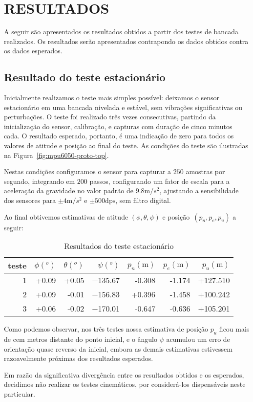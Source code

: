 \chapter{RESULTADOS}\label{chap:resuldatos}

A seguir são apresentados os resultados obtidos a partir dos testes de bancada realizados. Os resultados serão apresentados contrapondo os dados obtidos contra os dados esperados.

\section{Resultado do teste estacionário}

Inicialmente realizamos o teste mais simples possível: deixamos o sensor estacionário em uma bancada nivelada e estável, sem vibrações significativas ou perturbações. O teste foi realizado três vezes consecutivas, partindo da inicialização do sensor, calibração, e capturas com duração de cinco minutos cada. O resultado esperado, portanto, é uma indicação de zero para todos os valores de atitude e posição ao final do teste. As condições do teste são ilustradas na Figura~\ref{fig:mpu6050-proto-top}.

Nestas condições configuramos o sensor para capturar a \(250\) amostras por segundo, integrando em \(200\) passos, configurando um fator de escala para a aceleração da gravidade no valor padrão de \(9.8\textrm{m}/{s}^{2}\), ajustando a sensibilidade dos sensores para \(\pm 4\textrm{m}/{s}^{2}\) e \(\pm 500\textrm{dps}\), sem filtro digital.

Ao final obtivemos estimativas de atitude \((\phi,\theta,\psi)\) e posição~\((p_{n},p_{e},p_{u})\) a seguir:

\begin{table}[ht]
    \caption{Resultados do teste estacionário}
    \centering
    \begin{tabular}{r r r r r r r}
        teste & \(\phi (^{o})\) & \(\theta(^{o})\) & \(\psi(^{o})\) & \(p_{n}(\textrm{m})\) & \(p_{e}(\textrm{m})\) & \(p_{u}(\textrm{m})\)  \\
        \toprule
        1 & +0.09 & +0.05 & +135.67 & -0.308 & -1.174 & +127.510  \\
        2 & +0.09 & -0.01 & +156.83 & +0.396 & -1.458 & +100.242  \\
        3 & +0.06 & -0.02 & +170.01 & -0.647 & -0.636 & +105.201  \\
        \bottomrule
    \end{tabular}
    \label{Tab:tabela1}
\end{table}

Como podemos observar, nos três testes nossa estimativa de posição \(p_{u}\) ficou mais de cem metros distante do ponto inicial, e o ângulo \(\psi\) acumulou um erro de orientação quase reverso da inicial, embora as demais estimativas estivessem razoavelmente próximas dos resultados esperados.

Em razão da significativa divergência entre os resultados obtidos e os esperados, decidimos não realizar os testes cinemáticos, por considerá-los dispensáveis neste particular.
